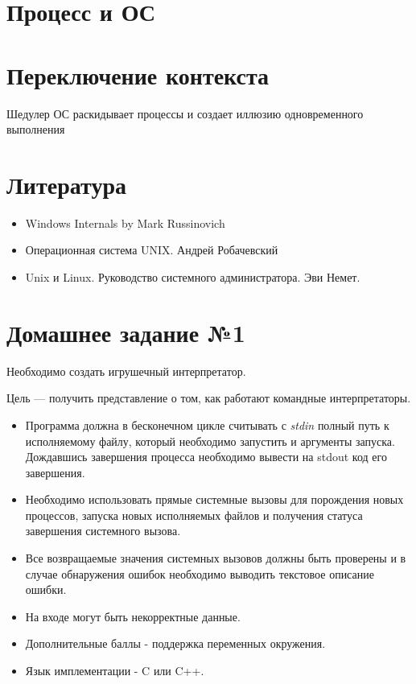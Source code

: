 \documentclass[../../lectures.tex]{subfiles}
\begin{document}
\section{Процесс и ОС}

\section{Переключение контекста}
Шедулер ОС раскидывает процессы и создает иллюзию одновременного выполнения

\section{Литература}
\begin{itemize}
    \item Windows Internals by Mark Russinovich
    \item Операционная система UNIX. Андрей Робачевский
    \item Unix и Linux. Руководство системного администратора. Эви Немет.
\end{itemize}

\newpage
\section{Домашнее задание №1} 
Необходимо создать игрушечный интерпретатор.

Цель --- получить представление о том, как работают командные интерпретаторы.
\begin{itemize}
    \item Программа должна в бесконечном цикле считывать с \emph{stdin} полный путь к
          исполняемому файлу, который необходимо запустить и аргументы запуска.
          Дождавшись завершения процесса необходимо вывести на stdout код его завершения.

    \item Необходимо использовать прямые системные вызовы для порождения новых процессов,
          запуска новых исполняемых файлов и получения статуса завершения системного
          вызова.

    \item Все возвращаемые значения системных вызовов должны быть проверены и в случае
          обнаружения ошибок необходимо выводить текстовое описание ошибки.

    \item На входе могут быть некорректные данные.

    \item Дополнительные баллы - поддержка переменных окружения.

    \item Язык имплементации - C или C++.
\end{itemize}



\end{document}
